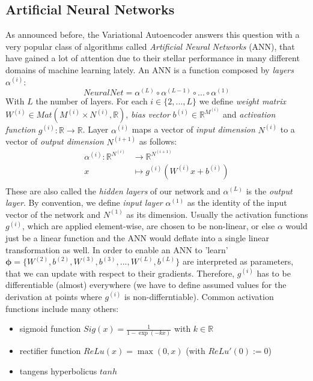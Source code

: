 \documentclass[12pt]{report}
\theoremstyle{definition}
\begin{document}
\subsection{Artificial Neural Networks}
As announced before, the Variational Autoencoder answers this question with a very popular class of algorithms called \emph{Artificial Neural Networks} (ANN), that have gained a lot of attention due to their stellar performance in many different domains of machine learning lately. An ANN is a function composed by \emph{layers} $\alpha^{(i)}$: 
\begin{equation}
NeuralNet = \alpha^{(L)} \circ \alpha^{(L-1)} \circ ... \circ \alpha^{(1)}
\end{equation}
With $L$ the number of layers. For each $i \in \{2, ..., L\} $ we define \emph{weight matrix} $W^{(i)} \in Mat(M^{(i)} \times N^{(i)}, \mathbb{R})$, \emph{bias vector} $b^{(i)} \in \mathbb{R}^{M^{(i)}}$ and \emph{activation function} $g^{(i)}: \mathbb{R} \rightarrow \mathbb{R}$. Layer $\alpha^{(i)}$ maps a vector of \emph{input dimension} $N^{(i)}$ to a vector of \emph{output dimension} $N^{(i+1)}$ as follows:
\begin{equation}
\begin{split}
\alpha^{(i)}: \mathbb{R}^{N^{(i)}} & \rightarrow \mathbb{R}^{N^{(i+1)}} \\
x & \mapsto g^{(i)}(W^{(i)}x+b^{(i)})\\
\end{split}
\end{equation}
These are also called the \emph{hidden layers} of our network and $\alpha^{(L)}$ is the \emph{output layer}. By convention, we define \emph{input layer} $\alpha^{(1)}$ as the identity of the input vector of the network and $N^{(1)}$ as its dimension.
Usually the activation functions $g^{(i)}$, which are applied element-wise, are chosen to be non-linear, or else $\alpha$ would just be a linear function and the ANN would deflate into a single linear transformation as well. 
In order to enable an ANN to 'learn' $\pmb{\phi} = \{W^{(2)},  b^{(2)}, W^{(3)},  b^{(3)}, ..., W^{(L)},  b^{(L)}\}$ are interpreted as parameters, that we can update with respect to their gradients. Therefore, $g^{(i)}$ has to be differentiable (almost) everywhere (we have to define assumed values for the derivation at points where $g^{(i)}$ is non-differntiable). Common activation functions include many others:
\begin{itemize}
\item sigmoid function $Sig(x) = \frac{1}{1 - \exp(-kx)}$ with $k \in \mathbb{R}$
\item rectifier function $ReLu(x) = \max(0, x)$ (with $ReLu'(0) := 0$)
\item tangens hyperbolicus $tanh$
\end{itemize} 
\end{document}
